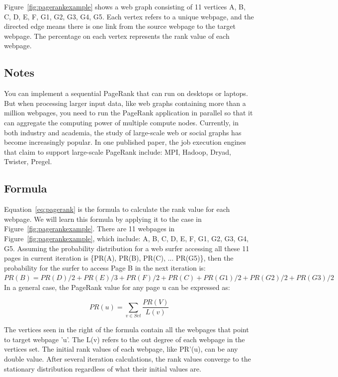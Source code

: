 Figure~\ref{fig:pagerankexample} shows a web graph consisting of 11 vertices
{A, B, C, D, E, F, G1, G2, G3, G4, G5}. Each vertex refers to a unique webpage,
and the directed edge means there is one link from the source webpage to the
target webpage. The percentage on each vertex represents the rank value of each
webpage.

\subsection*{Notes}

You can implement a sequential PageRank that can run on desktops or laptops.
But when processing larger input data, like web graphs containing more than a
million webpages, you need to run the PageRank application in parallel so that
it can aggregate the computing power of multiple compute nodes. Currently, in
both industry and academia, the study of large-scale web or social graphs has
become increasingly popular. In one published paper, the job execution engines
that claim to support large-scale PageRank include: MPI, Hadoop, Dryad,
Twister, Pregel. 

\subsection*{Formula}

Equation~\ref{eq:pagerank} is the formula to calculate the rank value for each
webpage. We will learn this formula by applying it to the case in
Figure~\ref{fig:pagerankexample}. There are 11 webpages in
Figure~\ref{fig:pagerankexample}, which include: {A, B, C, D, E, F, G1, G2, G3,
G4, G5}. Assuming the probability distribution for a web surfer accessing all
these 11 pages in current iteration is \{PR(A), PR(B), PR(C), ... PR(G5)\},
then the probability for the surfer to access Page B in the next iteration is:
\\

$PR(B) = PR(D)/2 + PR(E)/3 + PR(F)/2 + PR(C) + PR(G1)/2 + PR(G2)/2 + PR(G3)/2 $\\


In a general case, the PageRank value for any page u can be expressed as:

\begin{equation}\label{eq:pagerank}
PR(u) = \sum_{v \in Set} \frac{PR(V)}{L(v)}
\end{equation}

The vertices seen in the right of the formula contain all the webpages that
point to target webpage 'u'. The L(v) refers to the out degree of each webpage
in the vertices set. The initial rank values of each webpage, like PR'(u), can
be any double value. After several iteration calculations, the rank values
converge to the stationary distribution regardless of what their initial values
are.

